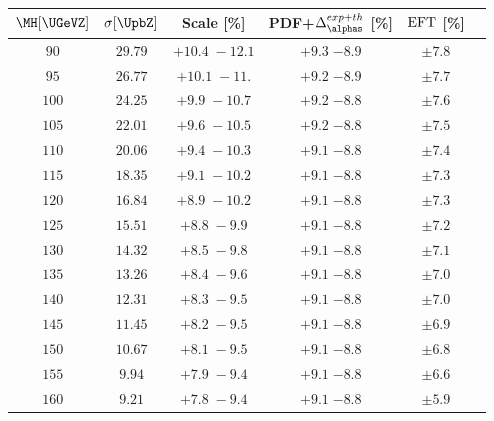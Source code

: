 \begin{table}[!h]


   \begin{center}
    \small
    \begin{tabular}{cccccc}\hline
    $\MH[\UGeVZ]$ & $\sigma[\UpbZ]$  & Scale [\%] &  PDF+$\Delta^{exp+th}_{\alphas}$  [\%]  & ${\rm EFT}$  [\%]  \\ \hline
$90$  & $29.79$ & ${+10.4 \; -12.1}$ & ${+9.3}\;{ -8.9}$ & ${\pm 7.8} $  \\
$95$  & $26.77$ & ${+10.1 \; -11. }$ & ${+9.2}\;{ -8.9}$ & ${\pm 7.7} $  \\  
$100$ & $24.25$ & ${+9.9 \; -10.7 }$ & ${+9.2}\;{ -8.8}$ & ${\pm 7.6} $  \\  
$105$ & $22.01$ & ${+9.6 \; -10.5 }$ & ${+9.2}\;{ -8.8}$ & ${\pm 7.5} $  \\  
$110$ & $20.06$ & ${+9.4 \; -10.3 }$ & ${+9.1}\;{ -8.8}$ & ${\pm 7.4} $  \\  
$115$ & $18.35$ & ${+9.1 \; -10.2 }$ & ${+9.1}\;{ -8.8}$ & ${\pm 7.3} $  \\  
$120$ & $16.84$ & ${+8.9 \; -10.2 }$ & ${+9.1}\;{ -8.8}$ & ${\pm 7.3} $  \\  
$125$ & $15.51$ & ${ +8.8 \; -9.9 }$ & ${+9.1}\;{ -8.8}$ & ${\pm 7.2} $  \\  
$130$ & $14.32$ & ${ +8.5 \; -9.8 }$ & ${+9.1}\;{ -8.8}$ & ${\pm 7.1} $  \\  
$135$ & $13.26$ & ${ +8.4 \; -9.6 }$ & ${+9.1}\;{ -8.8}$ & ${\pm 7.0} $  \\  
$140$ & $12.31$ & ${ +8.3 \; -9.5 }$ & ${+9.1}\;{ -8.8}$ & ${\pm 7.0} $  \\  
$145$ & $11.45$ & ${ +8.2 \; -9.5 }$ & ${+9.1}\;{ -8.8}$ & ${\pm 6.9} $  \\  
$150$ & $10.67$ & ${ +8.1 \; -9.5 }$ & ${+9.1}\;{ -8.8}$ & ${\pm 6.8} $  \\  
$155$ & $9.94$  & ${ +7.9 \; -9.4 }$ & ${+9.1}\;{ -8.8}$ & ${\pm 6.6} $  \\  
$160$ & $9.21$  & ${ +7.8 \; -9.4 }$ & ${+9.1}\;{ -8.8}$ & ${\pm 5.9} $  \\  

\end{tabular}
\end{center}
\end{table}
